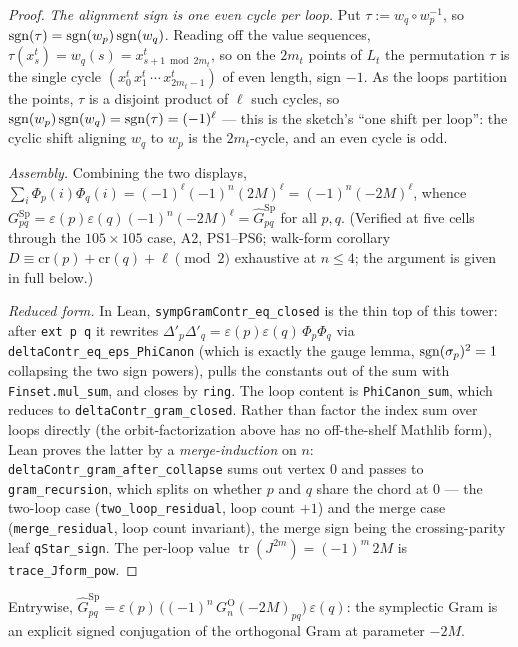 \begin{proof}
\medskip\noindent\emph{The alignment sign is one even cycle per loop.}
Put $\tau:=w_q\circ w_p^{-1}$, so $\operatorname{sgn}(\tau)=\operatorname{sgn}(w_p)\operatorname{sgn}(w_q)$. Reading
off the value sequences, $\tau(x^t_s)=w_q(s)=x^t_{s+1\bmod 2m_t}$, so on
the $2m_t$ points of $L_t$ the permutation $\tau$ is the single cycle
$(x^t_0\,x^t_1\,\cdots\,x^t_{2m_t-1})$ of even length, sign $-1$. As the
loops partition the points, $\tau$ is a disjoint product of $\ell$ such
cycles, so $\operatorname{sgn}(w_p)\operatorname{sgn}(w_q)=\operatorname{sgn}(\tau)=(-1)^{\ell}$ --- this is the
sketch's ``one shift per loop'': the cyclic shift aligning $w_q$ to $w_p$
is the $2m_t$-cycle, and an even cycle is odd.

\medskip\noindent\emph{Assembly.} Combining the two displays,
$\sum_i\Phi_p(i)\Phi_q(i)=(-1)^{\ell}(-1)^n(2M)^{\ell}=(-1)^n(-2M)^{\ell}$,
whence
$G^{\mathrm{Sp}}_{pq}=\varepsilon(p)\varepsilon(q)(-1)^n(-2M)^{\ell}
=\widehat G^{\mathrm{Sp}}_{pq}$ for all $p,q$. (Verified at five cells
through the $105\times105$ case, A2, PS1--PS6; walk-form corollary
$D\equiv\mathrm{cr}(p)+\mathrm{cr}(q)+\ell\pmod2$ exhaustive at $n\le4$;
the argument is given in full below.)

\medskip\noindent\emph{Reduced form.} In Lean,
\texttt{sympGramContr\_eq\_closed} is the thin top of this tower: after
\texttt{ext p q} it rewrites $\Delta'_p\Delta'_q
=\varepsilon(p)\varepsilon(q)\,\Phi_p\Phi_q$ via
\texttt{deltaContr\_eq\_eps\_PhiCanon} (which is exactly the gauge lemma,
$\operatorname{sgn}(\sigma_p)^2=1$ collapsing the two sign powers), pulls the constants
out of the sum with \texttt{Finset.mul\_sum}, and closes by \texttt{ring}.
The loop content is \texttt{PhiCanon\_sum}, which reduces to
\texttt{deltaContr\_gram\_closed}. Rather than factor the index sum over
loops directly (the orbit-factorization above has no off-the-shelf Mathlib
form), Lean proves the latter by a \emph{merge-induction} on $n$:
\texttt{deltaContr\_gram\_after\_collapse} sums out vertex $0$ and passes to
\texttt{gram\_recursion}, which splits on whether $p$ and $q$ share the
chord at $0$ --- the two-loop case (\texttt{two\_loop\_residual}, loop count
$+1$) and the merge case (\texttt{merge\_residual}, loop count invariant),
the merge sign being the crossing-parity leaf \texttt{qStar\_sign}. The
per-loop value $\operatorname{tr}(J^{2m})=(-1)^m\,2M$ is
\texttt{trace\_Jform\_pow}.
\end{proof}

\begin{corollary}\label{cor:symp_conjugation}
\leanok
{}
Entrywise, $\widehat G^{\mathrm{Sp}}_{pq} = \varepsilon(p)\,\bigl((-1)^n\,
G^{\mathrm O}_n(-2M)_{pq}\bigr)\,\varepsilon(q)$: the symplectic Gram is an
explicit signed conjugation of the orthogonal Gram at parameter $-2M$.
\end{corollary}

